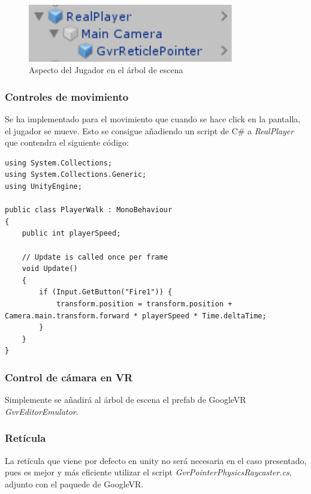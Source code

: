 \begin{figure}[htb]
	\centering
	\includegraphics[width=0.8\textwidth]{./imagenes/player}
	\caption{Aspecto del Jugador en el árbol de escena}
\end{figure} 

\subsubsection{Controles de movimiento}

\quad Se ha implementado para el movimiento que cuando se hace click en la pantalla, el jugador se mueve. Esto se consigue añadiendo un script de C\# a \textit{RealPlayer} que contendra el siguiente código:

\lstset{language=[sharp]C, breaklines=true, basicstyle=\footnotesize}
\begin{lstlisting}[frame=single, caption={PlayerWalk.cs}]
using System.Collections;
using System.Collections.Generic;
using UnityEngine;

public class PlayerWalk : MonoBehaviour
{
    public int playerSpeed;

    // Update is called once per frame
    void Update()
    {
        if (Input.GetButton("Fire1")) {
            transform.position = transform.position + Camera.main.transform.forward * playerSpeed * Time.deltaTime;
        }
    }
}
\end{lstlisting}

\subsubsection{Control de cámara en VR}

\quad Simplemente se añadirá al árbol de escena el prefab de GoogleVR \textit{GvrEditorEmulator}.

\subsubsection{Retícula}

\quad La retícula que viene por defecto en unity no será necesaria en el caso presentado, pues es mejor y más eficiente utilizar el script \textit{GvrPointerPhysicsRaycaster.cs}, adjunto con el paquede de GoogleVR.\\

